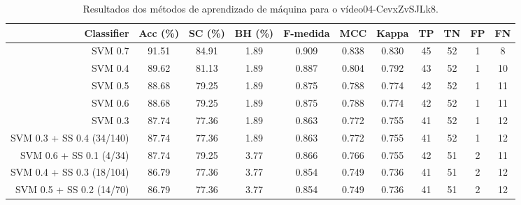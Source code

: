 \begin{table}[!htb]
\centering
\caption{Resultados dos métodos de aprendizado de máquina para o vídeo04-CevxZvSJLk8.}
\label{tab:04-CevxZvSJLk8}
\begin{tabular}{r|c|c|c|c|c|c|c|c|c|c}
\hline\hline
Classifier & Acc (\%) & SC (\%) & BH (\%) & F-medida & MCC & Kappa & TP & TN & FP & FN \\ \hline
SVM 0.7 & 91.51 & 84.91 & 1.89 & 0.909 & 0.838 & 0.830 & 45 & 52 & 1 & 8 \\ 
SVM 0.4 & 89.62 & 81.13 & 1.89 & 0.887 & 0.804 & 0.792 & 43 & 52 & 1 & 10 \\ 
SVM 0.5 & 88.68 & 79.25 & 1.89 & 0.875 & 0.788 & 0.774 & 42 & 52 & 1 & 11 \\ 
SVM 0.6 & 88.68 & 79.25 & 1.89 & 0.875 & 0.788 & 0.774 & 42 & 52 & 1 & 11 \\ 
SVM 0.3 & 87.74 & 77.36 & 1.89 & 0.863 & 0.772 & 0.755 & 41 & 52 & 1 & 12 \\ 
SVM 0.3 + SS 0.4 (34/140) & 87.74 & 77.36 & 1.89 & 0.863 & 0.772 & 0.755 & 41 & 52 & 1 & 12 \\ 
SVM 0.6 + SS 0.1 (4/34) & 87.74 & 79.25 & 3.77 & 0.866 & 0.766 & 0.755 & 42 & 51 & 2 & 11 \\ 
SVM 0.4 + SS 0.3 (18/104) & 86.79 & 77.36 & 3.77 & 0.854 & 0.749 & 0.736 & 41 & 51 & 2 & 12 \\ 
SVM 0.5 + SS 0.2 (14/70) & 86.79 & 77.36 & 3.77 & 0.854 & 0.749 & 0.736 & 41 & 51 & 2 & 12 \\ 
\hline\hline
\end{tabular}
\end{table}
